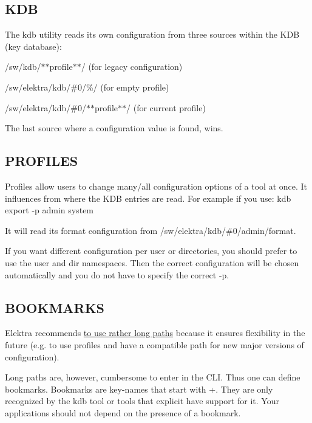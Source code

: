 \subsection*{K\+D\+B}

The {\ttfamily kdb} utility reads its own configuration from three sources within the K\+D\+B (key database)\+:


\begin{DoxyEnumerate}
\item /sw/kdb/$\ast$$\ast$profile$\ast$$\ast$/ (for legacy configuration)
\item /sw/elektra/kdb/\#0/\%/ (for empty profile)
\item /sw/elektra/kdb/\#0/$\ast$$\ast$profile$\ast$$\ast$/ (for current profile)
\end{DoxyEnumerate}

The last source where a configuration value is found, wins.

\subsection*{P\+R\+O\+F\+I\+L\+E\+S}

Profiles allow users to change many/all configuration options of a tool at once. It influences from where the K\+D\+B entries are read. For example if you use\+: {\ttfamily kdb export -\/p admin system}

It will read its format configuration from {\ttfamily /sw/elektra/kdb/\#0/admin/format}.

If you want different configuration per user or directories, you should prefer to use the {\ttfamily user} and {\ttfamily dir} namespaces. Then the correct configuration will be chosen automatically and you do not have to specify the correct {\ttfamily -\/p}.

\subsection*{B\+O\+O\+K\+M\+A\+R\+K\+S}

Elektra recommends \hyperlink{doc_tutorials_application-integration_md}{to use rather long paths} because it ensures flexibility in the future (e.\+g. to use profiles and have a compatible path for new major versions of configuration).

Long paths are, however, cumbersome to enter in the C\+L\+I. Thus one can define bookmarks. Bookmarks are key-\/names that start with {\ttfamily +}. They are only recognized by the {\ttfamily kdb} tool or tools that explicit have support for it. Your applications should not depend on the presence of a bookmark.

